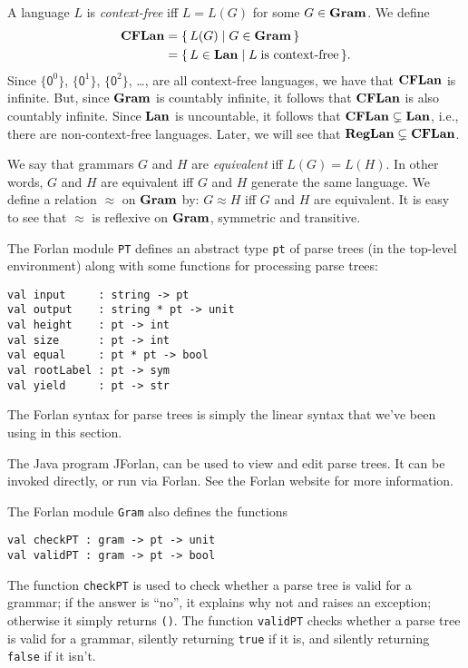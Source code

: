 %
%
A language $L$ is \emph{context-free} iff $L=L(G)$ for some
$G\in\mathbf{Gram}$.  We define
%
%
\begin{align*}
\mathbf{CFLan} &= \{ \, L(G) \mid G\in\mathbf{Gram} \, \} \\
&= \{ \, L\in\mathbf{Lan} \mid L\;\allowbreak\mbox{is context-free}\allowbreak \, \} .
\end{align*}
Since $\{\mathsf{0}^0\}$, $\{\mathsf{0}^1\}$, $\{\mathsf{0}^2\}$,
\ldots, are all context-free languages, we have that $\mathbf{CFLan}$ is
infinite.  But, since $\mathbf{Gram}$ is countably infinite, it follows that
$\mathbf{CFLan}$ is also countably infinite.
Since $\mathbf{Lan}$ is uncountable, it follows that
$\mathbf{CFLan}\subsetneq\mathbf{Lan}$, i.e., there are non-context-free
languages.  Later, we will see that $\mathbf{RegLan}\subsetneq\mathbf{CFLan}$.

%
%
%
We say that grammars $G$ and $H$ are
\emph{equivalent} iff $L(G) = L(H)$.  In other words, $G$
and $H$ are equivalent iff $G$ and $H$ generate the same
language.  We define a relation $\approx$ on $\mathbf{Gram}$ by:
$G\approx H$ iff $G$ and $H$ are equivalent.  It is easy to see
that $\approx$ is reflexive on $\mathbf{Gram}$, symmetric and transitive.

The Forlan module \texttt{PT} defines an abstract type \texttt{pt} of
%
parse trees (in the top-level environment) along with some functions
for processing parse trees:
\begin{verbatim}
val input     : string -> pt
val output    : string * pt -> unit
val height    : pt -> int
val size      : pt -> int
val equal     : pt * pt -> bool
val rootLabel : pt -> sym
val yield     : pt -> str
\end{verbatim}
%
%
%
%
%
%
%
The Forlan syntax for parse trees is simply the linear syntax that
we've been using in this section.

%
The Java program JForlan, can be used to view and edit parse
trees.  It can be invoked directly, or run via
Forlan.  See the Forlan website for more information.

The Forlan module \texttt{Gram} also defines the functions
\begin{verbatim}
val checkPT : gram -> pt -> unit
val validPT : gram -> pt -> bool
\end{verbatim}
%
%
The function \texttt{checkPT} is used to check whether a parse tree
is valid for a grammar; if the answer is ``no'', it explains why not
and raises an exception; otherwise it simply returns \texttt{()}.
The function \texttt{validPT} checks whether a parse tree is valid
for a grammar, silently returning \texttt{true} if it is, and silently
returning \texttt{false} if it isn't.

